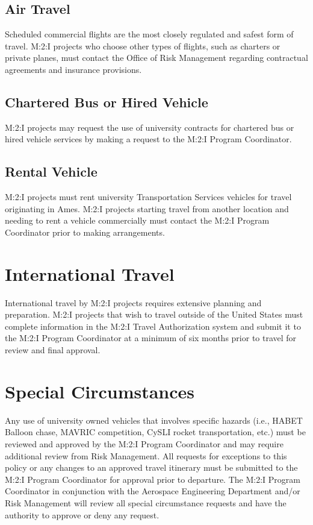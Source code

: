 {\subsection{Air Travel}

Scheduled commercial flights are the most closely regulated and safest form of travel. M:2:I projects who choose other types of flights, such as charters or private planes, must contact the Office of Risk Management regarding contractual agreements and insurance provisions.

\subsection{Chartered Bus or Hired Vehicle}

M:2:I projects may request the use of university contracts for chartered bus or hired vehicle services by making a request to the M:2:I Program Coordinator.

\subsection{Rental Vehicle}

M:2:I projects must rent university Transportation Services vehicles for travel originating in Ames. M:2:I projects starting travel from another location and needing to rent a vehicle commercially must contact the M:2:I Program Coordinator prior to making arrangements.

\section{International Travel}
International travel by M:2:I projects requires extensive planning and preparation. M:2:I projects that wish to travel outside of the United States must complete information in the M:2:I Travel Authorization system and submit it to the M:2:I Program Coordinator at a minimum of six months prior to travel for review and final approval.

\section{Special Circumstances}
Any use of university owned vehicles that involves specific hazards (i.e., HABET Balloon chase, MAVRIC competition, CySLI rocket transportation, etc.) must be reviewed and approved by the M:2:I Program Coordinator and may require additional review from Risk Management.  All requests for exceptions to this policy or any changes to an approved travel itinerary must be submitted to the M:2:I Program Coordinator for approval prior to departure.  The M:2:I Program Coordinator in conjunction with the Aerospace Engineering Department and/or Risk Management will review all special circumstance requests and have the authority to approve or deny any request.

}
